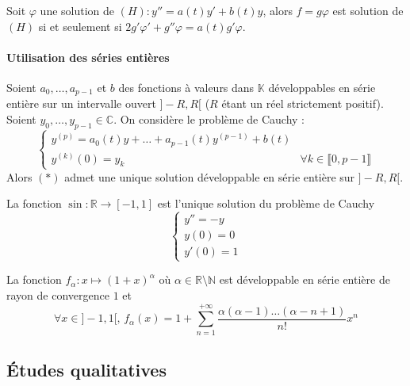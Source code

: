   \begin{example}
    Soit $\varphi$ une solution de $(H) : y'' = a(t) y' + b(t) y$, alors $f = g \varphi$ est solution de $(H)$ si et seulement si $2g' \varphi' + g'' \varphi = a(t)g'\varphi$.
  \end{example}

  \paragraph{Utilisation des séries entières}


  \begin{proposition}
    Soient $a_0, \dots, a_{p-1}$ et $b$ des fonctions à valeurs dans $\mathbb{K}$ développables en série entière sur un intervalle ouvert $]-R, R[$ ($R$ étant un réel strictement positif). Soient $y_0, \dots, y_{p-1} \in \mathbb{C}$. On considère le problème de Cauchy :
    \[ \begin{cases} y^{(p)} = a_0(t)y + \dots + a_{p-1}(t)y^{(p-1)} + b(t) & \\ y^{(k)}(0) = y_k & \forall k \in \llbracket 0, p-1 \rrbracket \end{cases} \tag{$*$} \]
    Alors $(*)$ admet une unique solution développable en série entière sur $]-R,R[$.
  \end{proposition}

  \begin{example}
    La fonction $\sin : \mathbb{R} \rightarrow [-1,1]$ est l'unique solution du problème de Cauchy
    \[ \begin{cases} y'' = -y \\ y(0) = 0 \\ y'(0) = 1 \end{cases} \]
  \end{example}


  \begin{application}
    La fonction $f_\alpha : x \mapsto (1 + x)^\alpha$ où $\alpha \in \mathbb{R} \setminus \mathbb{N}$ est développable en série entière de rayon de convergence $1$ et
    \[ \forall x \in ]-1,1[, \, f_\alpha(x) = 1 + \sum_{n=1}^{+\infty} \frac{\alpha (\alpha - 1) \dots (\alpha - n+1)}{n!} x^n \]
  \end{application}

  \subsection{Études qualitatives}

